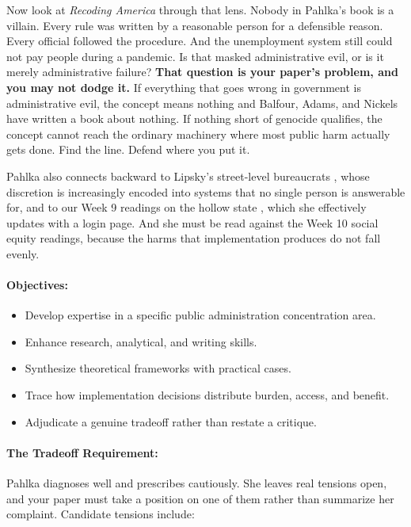 \documentclass[11pt]{article}     %
\begin{document}
Now look at \textit{Recoding America} through that lens. Nobody in Pahlka's book is a villain. Every rule was written by a reasonable person for a defensible reason. Every official followed the procedure. And the unemployment system still could not pay people during a pandemic. Is that masked administrative evil, or is it merely administrative failure? \textbf{That question is your paper's problem, and you may not dodge it.} If everything that goes wrong in government is administrative evil, the concept means nothing and Balfour, Adams, and Nickels have written a book about nothing. If nothing short of genocide qualifies, the concept cannot reach the ordinary machinery where most public harm actually gets done. Find the line. Defend where you put it.

Pahlka also connects backward to Lipsky's street-level bureaucrats \citeyearpar{Lipsky2010}, whose discretion is increasingly encoded into systems that no single person is answerable for, and to our Week 9 readings on the hollow state \citep{milward2000}, which she effectively updates with a login page. And she must be read against the Week 10 social equity readings, because the harms that implementation produces do not fall evenly.

\paragraph*{Objectives:}
\begin{itemize}
    \item Develop expertise in a specific public administration concentration area.
    \item Enhance research, analytical, and writing skills.
    \item Synthesize theoretical frameworks with practical cases.
    \item Trace how implementation decisions distribute burden, access, and benefit.
    \item Adjudicate a genuine tradeoff rather than restate a critique.
\end{itemize}

\paragraph*{The Tradeoff Requirement:}
\noindent Pahlka diagnoses well and prescribes cautiously. She leaves real tensions open, and your paper must take a position on one of them rather than summarize her complaint. Candidate tensions include:
\end{document}
